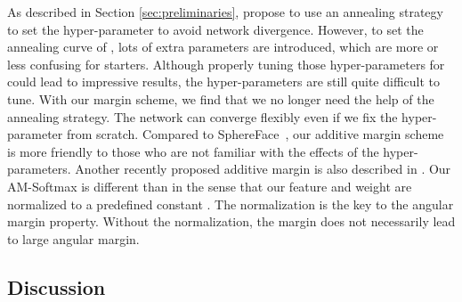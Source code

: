 \documentclass[10pt,twocolumn,letterpaper]{article}
\begin{document}
As described in Section \ref{sec:preliminaries}, \cite{liu2016large,liu2017sphereface} propose to use an annealing strategy to set the hyper-parameter  to avoid network divergence. However, to set the annealing curve of , lots of extra parameters are introduced, which are more or less confusing for starters. Although properly tuning those hyper-parameters for  could lead to impressive results, the hyper-parameters are still quite difficult to tune. With our margin scheme, we find that we no longer need the help of the annealing strategy. The network can converge flexibly even if we fix the hyper-parameter  from scratch. Compared to SphereFace~\cite{liu2017sphereface}, our additive margin scheme is more friendly to those who are not familiar with the effects of the hyper-parameters. Another recently proposed additive margin is also described in \cite{liang2017soft}. Our AM-Softmax is different than \cite{liang2017soft} in the sense that our feature and weight are normalized to a predefined constant . The normalization is the key to the angular margin property. Without the normalization, the margin  does not necessarily lead to large angular margin.



\begin{comment}
As explained in Figure 4 of \cite{wang2017normface}, optimizing  will also enlarge the norm (magnitude) of the weights and the features. To prevent the norm from growing aggressively to infinity, we usually apply weight decay for the weight normalization. Similarly, for the feature normalization we regularize the features using feature decay. The feature decay is defined as

which is used to prevent the norm of features from becoming too large. Without this regularization, when we set a large  at the beginning, the feature norm will likely to be very large in the initial a few hundred iterations, which would cause the network diverge sometimes.
\end{comment}

\subsection{Discussion}
\label{sec:understanding}
\end{document}
